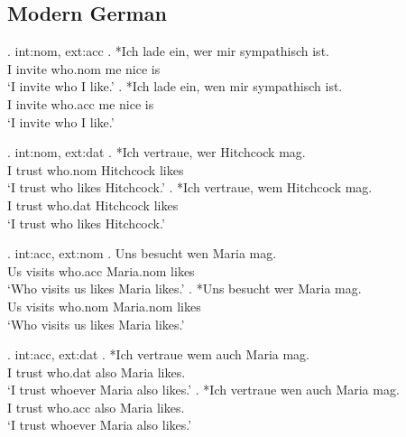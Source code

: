 \subsection{Modern German}

\ex. \ac{int}:\ac{nom}, \ac{ext}:\ac{acc}
\ag. *Ich {lade ein}, wer mir sympathisch ist.\\
 I invite\scsub{[acc]} who.\ac{nom} me nice is\scsub{[nom]}\\
 `I invite who I like.' 
\bg. *Ich {lade ein}, wen mir sympathisch ist.\\
 I invite\scsub{[acc]} who.\ac{acc} me nice is\scsub{[nom]}\\
 `I invite who I like.' 

\ex. \ac{int}:\ac{nom}, \ac{ext}:\ac{dat}
\ag. *Ich vertraue, wer Hitchcock mag.\\
 I trust\scsub{[dat]} who.\ac{nom} Hitchcock likes\scsub{[nom]}\\
 `I trust who likes Hitchcock.' 
\bg. *Ich vertraue, wem Hitchcock mag.\\
 I trust\scsub{[dat]} who.\ac{dat} Hitchcock likes\scsub{[nom]}\\
 `I trust who likes Hitchcock.' 

\ex. \ac{int}:\ac{acc}, \ac{ext}:\ac{nom}
\ag. Uns besucht wen Maria mag.\\
 Us visits\scsub{[nom]} who.\ac{acc} Maria.\ac{nom} likes\scsub{[acc]}\\
 `Who visits us likes Maria likes.' 
\bg. *Uns besucht wer Maria mag.\\
 Us visits\scsub{[nom]} who.\ac{nom} Maria.\ac{nom} likes\scsub{[acc]}\\
 `Who visits us likes Maria likes.' 

 \ex. \ac{int}:\ac{acc}, \ac{ext}:\ac{dat}
\ag. *Ich vertraue wem auch Maria mag. \\
 I trust\scsub{[dat]} who.\ac{dat} also Maria likes\scsub{[acc]}.\\
 `I trust whoever Maria also likes.' 
\bg. *Ich vertraue wen auch Maria mag. \\
 I trust\scsub{[dat]} who.\ac{acc} also Maria likes\scsub{[acc]}.\\
 `I trust whoever Maria also likes.' 

